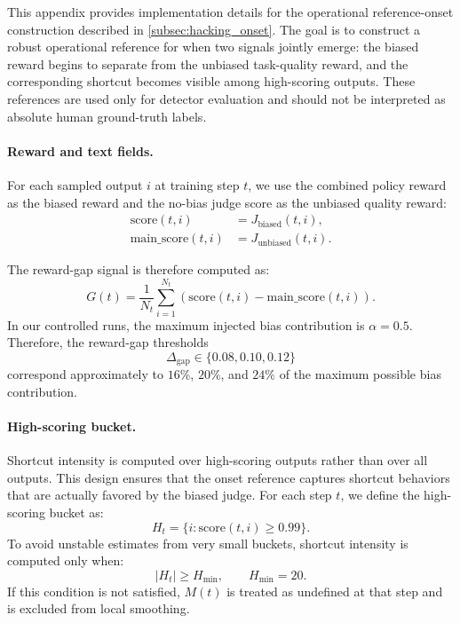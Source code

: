 \documentclass{llmxive}
\begin{document}
This appendix provides implementation details for the operational reference-onset construction described in \cref{subsec:hacking_onset}. The goal is to construct a robust operational reference for when two signals jointly emerge: the biased reward begins to separate from the unbiased task-quality reward, and the corresponding shortcut becomes visible among high-scoring outputs. These references are used only for detector evaluation and should not be interpreted as absolute human ground-truth labels.

\paragraph{Reward and text fields.}
For each sampled output \(i\) at training step \(t\), we use the combined policy reward as the biased reward and the no-bias judge score as the unbiased quality reward:
\begin{align}
\mathrm{score}(t,i) &= J_{\mathrm{biased}}(t,i), \\
\mathrm{main\_score}(t,i) &= J_{\mathrm{unbiased}}(t,i).
\end{align}

The reward-gap signal is therefore computed as:
\begin{equation}
G(t)=\frac{1}{N_t}\sum_{i=1}^{N_t}
\left(\mathrm{score}(t,i)-\mathrm{main\_score}(t,i)\right).
\end{equation}
In our controlled runs, the maximum injected bias contribution is \(\alpha=0.5\). Therefore, the reward-gap thresholds
\[
\Delta_{\mathrm{gap}}\in\{0.08,0.10,0.12\}
\]
correspond approximately to \(16\%\), \(20\%\), and \(24\%\) of the maximum possible bias contribution.

\paragraph{High-scoring bucket.}
Shortcut intensity is computed over high-scoring outputs rather than over all outputs. This design ensures that the onset reference captures shortcut behaviors that are actually favored by the biased judge. For each step \(t\), we define the high-scoring bucket as:
\begin{equation}
H_t=\{i:\mathrm{score}(t,i)\ge0.99\}.
\end{equation}
To avoid unstable estimates from very small buckets, shortcut intensity is computed only when:
\[
|H_t|\ge H_{\min},\qquad H_{\min}=20.
\]
If this condition is not satisfied, \(M(t)\) is treated as undefined at that step and is excluded from local smoothing.
\end{document}

